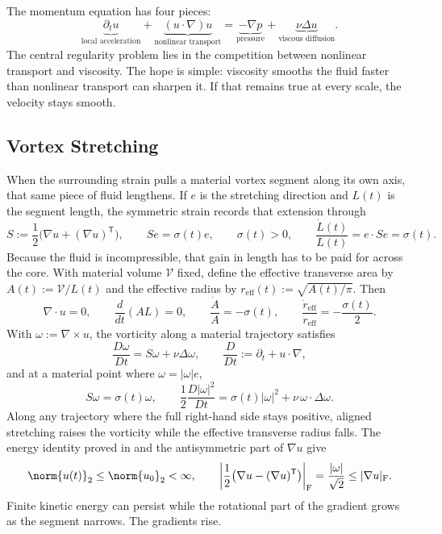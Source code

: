 
The momentum equation has four pieces:
\[
  \underbrace{\partial_t u}_{\text{local acceleration}}
  +
  \underbrace{(u\cdot\nabla)u}_{\text{nonlinear transport}}
  =
  \underbrace{-\nabla p}_{\text{pressure}}
  +
  \underbrace{\nu\Delta u}_{\text{viscous diffusion}}.
\]
The central regularity problem lies in the competition between nonlinear transport and viscosity.
The hope is simple: viscosity smooths the fluid faster than nonlinear transport can sharpen it.
If that remains true at every scale, the velocity stays smooth.

\subsection{Vortex Stretching}\label{sub:ThePerfectlyStretchingVortex}

When the surrounding strain pulls a material vortex segment along its own axis, that same piece of fluid lengthens. If \(e\) is the stretching direction and \(L(t)\) is the segment length, the symmetric strain records that extension through
\[
  S:=\frac12\bigl(\nabla u+(\nabla u)^{\mathsf T}\bigr),
  \qquad
  Se=\sigma(t)e,
  \qquad
  \sigma(t)>0,
  \qquad
  \frac{\dot L(t)}{L(t)}
  =
  e\cdot Se
  =
  \sigma(t).
\]
Because the fluid is incompressible, that gain in length has to be paid for across the core. With material volume \(\mathcal V\) fixed, define the effective transverse area by \(A(t):=\mathcal V/L(t)\) and the effective radius by \(r_{\mathrm{eff}}(t):=\sqrt{A(t)/\pi}\). Then
\[
  \nabla\cdot u=0,
  \qquad
  \frac{d}{dt}(A L)=0,
  \qquad
  \frac{\dot A}{A}=-\sigma(t),
  \qquad
  \frac{\dot r_{\mathrm{eff}}}{r_{\mathrm{eff}}}
  =
  -\frac{\sigma(t)}{2}.
\]
With \(\omega:=\nabla\times u\), the vorticity along a material trajectory satisfies
\[
  \frac{D\omega}{Dt}
  =
  S\omega+\nu\Delta\omega,
  \qquad
  \frac{D}{Dt}
  :=
  \partial_t+u\cdot\nabla,
\]
and at a material point where \(\omega=|\omega|e\),
\[
  S\omega
  =
  \sigma(t)\omega,
  \qquad
  \frac12\frac{D|\omega|^2}{Dt}
  =
  \sigma(t)|\omega|^2
  +
  \nu\,\omega\cdot\Delta\omega.
\]
Along any trajectory where the full right-hand side stays positive, aligned stretching raises the vorticity while the effective transverse radius falls. The energy identity proved in  and the antisymmetric part of \(\nabla u\) give
\[
  \norm{u(t)}_2
  \leq
  \norm{u_0}_2
  <\infty,
  \qquad
  \left|\frac12\bigl(\nabla u-(\nabla u)^{\mathsf T}\bigr)\right|_{\mathrm F}
  =
  \frac{|\omega|}{\sqrt2}
  \leq
  |\nabla u|_{\mathrm F}.
\]
Finite kinetic energy can persist while the rotational part of the gradient grows as the segment narrows. The gradients rise.

